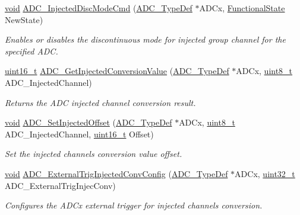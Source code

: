 \begin{DoxyCompactItemize}
\hyperlink{group___n_a_m_e_ga18028b8badbf1ea7e704ccac3c488e82}{void} \hyperlink{group___a_d_c___group6_ga0b583b94183fa4ff287177b9ee808092}{A\-D\-C\-\_\-\-Injected\-Disc\-Mode\-Cmd} (\hyperlink{struct_a_d_c___type_def}{A\-D\-C\-\_\-\-Type\-Def} $\ast$A\-D\-Cx, \hyperlink{group___exported__types_gac9a7e9a35d2513ec15c3b537aaa4fba1}{Functional\-State} New\-State)
\begin{DoxyCompactList}\small\item\em Enables or disables the discontinuous mode for injected group channel for the specified A\-D\-C. \end{DoxyCompactList}\item 
\hyperlink{stdint_8h_a273cf69d639a59973b6019625df33e30}{uint16\-\_\-t} \hyperlink{group___a_d_c___group6_ga1dea5ed24571a2e0ce4cbd41c9c1ec46}{A\-D\-C\-\_\-\-Get\-Injected\-Conversion\-Value} (\hyperlink{struct_a_d_c___type_def}{A\-D\-C\-\_\-\-Type\-Def} $\ast$A\-D\-Cx, \hyperlink{stdint_8h_aba7bc1797add20fe3efdf37ced1182c5}{uint8\-\_\-t} A\-D\-C\-\_\-\-Injected\-Channel)
\begin{DoxyCompactList}\small\item\em Returns the A\-D\-C injected channel conversion result. \end{DoxyCompactList}\item 
\hyperlink{group___n_a_m_e_ga18028b8badbf1ea7e704ccac3c488e82}{void} \hyperlink{group___a_d_c___group6_ga07a942613088ab3ecfc3d97a20475920}{A\-D\-C\-\_\-\-Set\-Injected\-Offset} (\hyperlink{struct_a_d_c___type_def}{A\-D\-C\-\_\-\-Type\-Def} $\ast$A\-D\-Cx, \hyperlink{stdint_8h_aba7bc1797add20fe3efdf37ced1182c5}{uint8\-\_\-t} A\-D\-C\-\_\-\-Injected\-Channel, \hyperlink{stdint_8h_a273cf69d639a59973b6019625df33e30}{uint16\-\_\-t} Offset)
\begin{DoxyCompactList}\small\item\em Set the injected channels conversion value offset. \end{DoxyCompactList}\item 
\hyperlink{group___n_a_m_e_ga18028b8badbf1ea7e704ccac3c488e82}{void} \hyperlink{group___a_d_c___group6_gafc02ce1e84e96b692adf085f61a0bca6}{A\-D\-C\-\_\-\-External\-Trig\-Injected\-Conv\-Config} (\hyperlink{struct_a_d_c___type_def}{A\-D\-C\-\_\-\-Type\-Def} $\ast$A\-D\-Cx, \hyperlink{stdint_8h_a435d1572bf3f880d55459d9805097f62}{uint32\-\_\-t} A\-D\-C\-\_\-\-External\-Trig\-Injec\-Conv)
\begin{DoxyCompactList}\small\item\em Configures the A\-D\-Cx external trigger for injected channels conversion. \end{DoxyCompactList}\item 

\end{DoxyCompactItemize}
